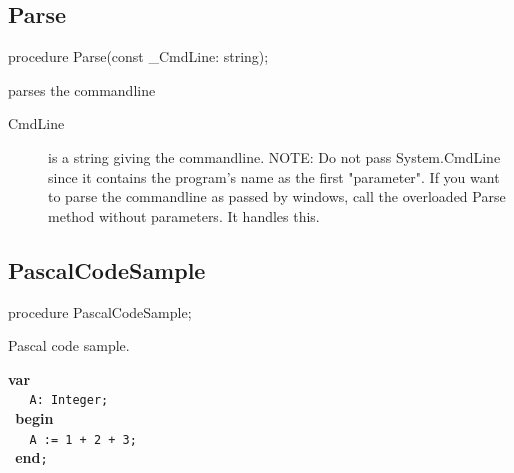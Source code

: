 \documentclass{report}
\begin{document}
\subsection*{Parse}
\begin{list}{}{
\setlength{\itemindent}{0cm}
\setlength{\listparindent}{0cm}
\setlength{\leftmargin}{\evensidemargin}
\addtolength{\leftmargin}{\tmplength}
\settowidth{\labelsep}{X}
\addtolength{\leftmargin}{\labelsep}
\setlength{\labelwidth}{\tmplength}
}
\begin{flushleft}
\item[\textbf{Declaration}\hfill]
\begin{ttfamily}
procedure Parse(const {\_}CmdLine: string);\end{ttfamily}


\end{flushleft}
\par
\item[\textbf{Description}]
parses the commandline\hfill\vspace*{1ex}

 \par
\item[\textbf{Parameters}]
\begin{description}
\item[CmdLine] is a string giving the commandline. NOTE: Do not pass System.CmdLine since it contains the program's name as the first "parameter". If you want to parse the commandline as passed by windows, call the overloaded Parse method without parameters. It handles this.
\end{description}


\end{list}
\subsection*{PascalCodeSample}
\begin{list}{}{
\setlength{\itemindent}{0cm}
\setlength{\listparindent}{0cm}
\setlength{\leftmargin}{\evensidemargin}
\addtolength{\leftmargin}{\tmplength}
\settowidth{\labelsep}{X}
\addtolength{\leftmargin}{\labelsep}
\setlength{\labelwidth}{\tmplength}
}
\begin{flushleft}
\item[\textbf{Declaration}\hfill]
\begin{ttfamily}
procedure PascalCodeSample;\end{ttfamily}


\end{flushleft}
\par
\item[\textbf{Description}]
Pascal code sample.\hfill\vspace*{1ex}

 \texttt{}\textbf{var}\texttt{\\\nopagebreak[3]
~~~A:~Integer;\\\nopagebreak[3]
~}\textbf{begin}\texttt{\\\nopagebreak[3]
~~~A~:=~1~+~2~+~3;\\\nopagebreak[3]
~}\textbf{end}\texttt{;\\
}

\end{list}
\end{document}
